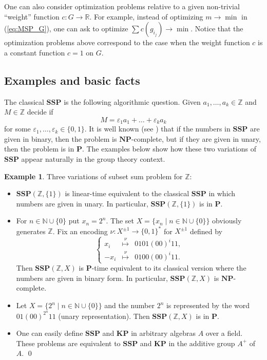 \documentclass[11pt]{amsart}
\theoremstyle{definition}
\newtheorem{example}[theorem]{Example}
\def\P{{\mathbf{P}}}
\def\NP{{\mathbf{NP}}}
\def\SSP{{\mathbf{SSP}}}
\def\KP{{\mathbf{KP}}}
\begin{document}
\medskip

One can also consider optimization problems relative to  a given non-trivial ``weight'' function $c:G \to \mathbb{R}$. For example, instead of optimizing $m\to\min$ in (\ref{eq:MSP_G}), one can ask to optimize $\sum c(g_{i_j})\to\min$. Notice that the optimization problems above correspond to the case when the weight function $c$ is a constant function $c = 1$ on $G$.





\subsection{Examples and basic facts}
\label{sec:general-properties}

The classical $\SSP$  is the following algorithmic question.
Given $a_1,\ldots,a_k\in \mathbb Z$ and $M\in \mathbb Z$ decide if
    $$M=\varepsilon_1 a_1+\ldots+\varepsilon_k a_k$$
for some $\varepsilon_1,\ldots,\varepsilon_k \in \{0,1\}$.
It is well known (see \cite{GJ,Papa,Papadimitriou-Steiglitz:1998})
that if the numbers in $\SSP$ are given in  binary, then
the problem is $\NP$-complete, but if they are given in unary,
then the problem is  in $\P$. The examples below show how these
two variations of $\SSP$  appear naturally in the group theory context.

\begin{example}\label{ex:inf_gen_set}
Three variations of subset sum problem for $\mathbb Z$:
\begin{itemize}
    \item
$\SSP(\mathbb Z,\{1\})$
is linear-time equivalent  to the   classical $\SSP$  in which numbers
are  given in unary.
In particular, $\SSP(\mathbb Z,\{1\})$ is  in $\P$.
    \item
For $n\in\mathbb N \cup\{0\}$ put $x_n=2^n$. The set
$X = \{x_n \mid n\in\mathbb N \cup\{0\}\}$
obviously generates $\mathbb Z$.
Fix an encoding $\nu:X^{\pm1} \to \{0,1\}^*$
for $X^{\pm1}$ defined by
$$
\left\{
\begin{array}{rcl}
x_i &\stackrel{\nu}{\mapsto}& 0101(00)^i11,\\
-x_i &\stackrel{\nu}{\mapsto}& 0100(00)^i11.
\end{array}
\right.
$$
Then $\SSP(\mathbb Z,X)$ is  $\P$-time equivalent to its  classical version where the  numbers are given in binary form.
In particular, $\SSP(\mathbb Z,X)$ is   $\NP$-complete.
    \item
Let $X = \{2^n \mid n\in\mathbb N \cup\{0\}\}$ and the number
$2^n$ is represented by the word $01(00)^{2^n}11$ (unary representation).
Then $\SSP(\mathbb Z,X)$ is  in $\P$.
    \item
One can easily define $\SSP$ and $\KP$ in arbitrary algebras $A$ over a field. These problems are equivalent to  $\SSP$ and $\KP$ in the additive group $A^+$ of $A$.
\qed
\end{itemize}
\end{example}
\end{document}
